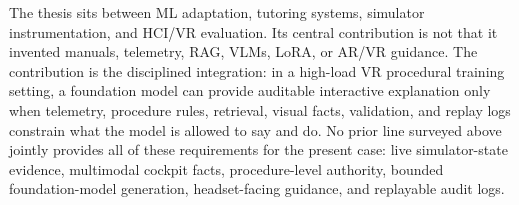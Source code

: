 The thesis sits between ML adaptation, tutoring systems, simulator
instrumentation, and HCI/VR evaluation. Its central contribution is not that it
invented manuals, telemetry, RAG, VLMs, LoRA, or AR/VR guidance. The
contribution is the disciplined integration: in a high-load VR procedural
training setting, a foundation model can provide auditable interactive
explanation only when telemetry, procedure rules, retrieval, visual facts,
validation, and replay logs constrain what the model is allowed to say and do.
No prior line surveyed above jointly provides all of these requirements for
the present case: live simulator-state evidence, multimodal cockpit facts,
procedure-level authority, bounded foundation-model generation, headset-facing
guidance, and replayable audit logs.
